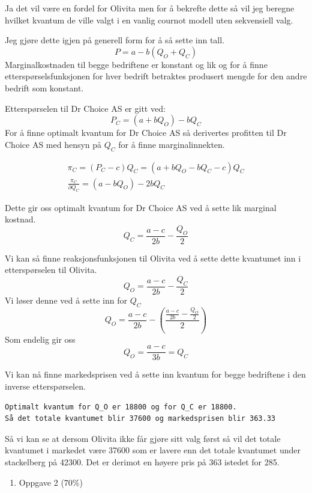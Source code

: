 \documentclass[
  12pt,
  a4paper,
  DIV=11,
  numbers=noendperiod]{scrartcl}
\providecommand{\tightlist}{%
  \setlength{\itemsep}{0pt}\setlength{\parskip}{0pt}}\usepackage{longtable,booktabs,array}
\begin{document}
Ja det vil være en fordel for Olivita men for å bekrefte dette så vil
jeg beregne hvilket kvantum de ville valgt i en vanlig cournot modell
uten sekvensiell valg.

Jeg gjøre dette igjen på generell form for å så sette inn tall. \[
P = a - b(Q_O + Q_C)
\] Marginalkostnaden til begge bedriftene er konstant og lik og for å
finne etterspørselsfunksjonen for hver bedrift betraktes produsert
mengde for den andre bedrift som konstant.

Etterspørselen til Dr Choice AS er gitt ved: \[
P_C = (a  + bQ_O)-bQ_C
\] For å finne optimalt kvantum for Dr Choice AS så derivertes profitten
til Dr Choice AS med hensyn på \(Q_C\) for å finne marginalinnekten.

\begin{align*}
\pi_C = (P_C - c)Q_C = (a  + bQ_O - bQ_C - c)Q_C \\
\frac{\pi_C}{\partial Q_C} = (a - bQ_O) - 2bQ_C
\end{align*}

Dette gir oss optimalt kvantum for Dr Choice AS ved å sette lik marginal
kostnad. \[
Q_C = \frac{a - c}{2b} - \frac{Q_O}{2}
\]

Vi kan så finne reaksjonsfunksjonen til Olivita ved å sette dette
kvantumet inn i etterspørselen til Olivita. \[
Q_O = \frac{a - c}{2b} - \frac{Q_C}{2}
\] Vi løser denne ved å sette inn for \(Q_C\) \[
Q_O = \frac{a - c}{2b} - \left(\frac{\frac{a - c}{2b} - \frac{Q_O}{2}}{2}\right)
\] Som endelig gir oss \[
Q_O = \frac{a - c}{3b} = Q_C
\]

Vi kan nå finne markedsprisen ved å sette inn kvantum for begge
bedriftene i den inverse etterspørselen.

\begin{verbatim}
Optimalt kvantum for Q_O er 18800 og for Q_C er 18800. 
Så det totale kvantumet blir 37600 og markedsprisen blir 363.33
\end{verbatim}

Så vi kan se at dersom Olivita ikke får gjøre sitt valg først så vil det
totale kvantumet i markedet være 37600 som er lavere enn det totale
kvantumet under stackelberg på 42300. Det er derimot en høyere pris på
363 istedet for 285.

\clearpage

\begin{enumerate}
\def\labelenumi{\arabic{enumi}.}
\setcounter{enumi}{1}
\tightlist
\item
  Oppgave 2 (70\%)
\end{enumerate}
\end{document}
